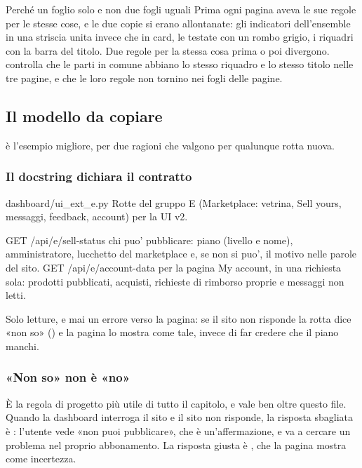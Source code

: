 \begin{perche}{Perché un foglio solo e non due fogli uguali}
Prima ogni pagina aveva le sue regole per le stesse cose, e le due copie si
erano allontanate: gli indicatori dell'ensemble in una striscia unita invece
che in card, le testate con un rombo grigio, i riquadri con la barra del
titolo. Due regole per la stessa cosa prima o poi divergono.
 controlla che le parti in comune
abbiano lo stesso riquadro e lo stesso titolo nelle tre pagine, e che le loro
regole non tornino nei fogli delle pagine.
\end{perche}

\subsection{Il modello da copiare}

 è l'esempio migliore, per due ragioni che valgono per
qualunque rotta nuova.

\subsubsection{Il docstring dichiara il contratto}

\begin{commento}{dashboard/ui\_ext\_e.py}
Rotte del gruppo E (Marketplace: vetrina, Sell yours, messaggi, feedback,
account) per la UI v2.

    GET  /api/e/sell-status   chi puo' pubblicare: piano (livello e nome),
                              amministratore, lucchetto del marketplace e, se
                              non si puo', il motivo nelle parole del sito.
    GET  /api/e/account-data  per la pagina My account, in una richiesta sola:
                              prodotti pubblicati, acquisti, richieste di
                              rimborso proprie e messaggi non letti.

Solo letture, e mai un errore verso la pagina: se il sito non risponde la
rotta dice «non so» () e la pagina lo mostra come tale, invece
di far credere che il piano manchi.
\end{commento}

\subsubsection{«Non so» non è «no»}

È la regola di progetto più utile di tutto il capitolo, e vale ben oltre
questo file. Quando la dashboard interroga il sito e il sito non risponde,
la risposta sbagliata è : l'utente vede «non puoi
pubblicare», che è un'affermazione, e va a cercare un problema nel proprio
abbonamento. La risposta giusta è , che la pagina mostra
come incertezza.

